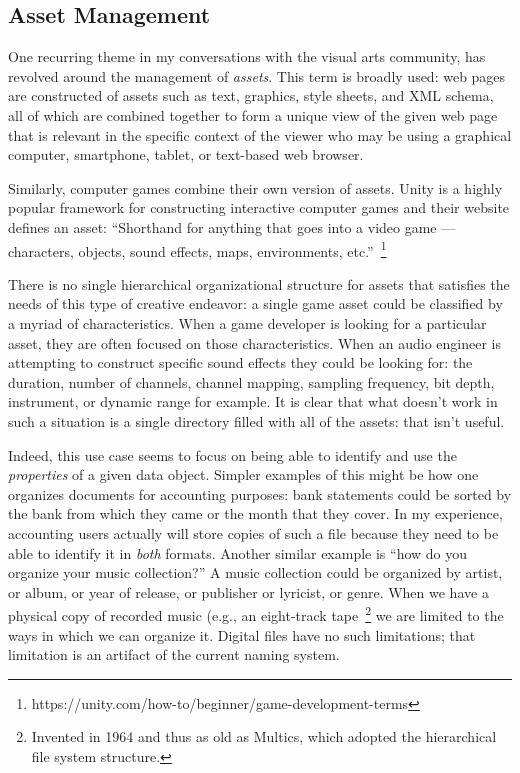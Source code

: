\subsection{Asset Management}
\label{ch:model:sec:use-cases:subsec:asset-management}

One recurring theme in my conversations with the visual arts community, has revolved
around the management of \emph{assets}. This term is broadly used: web pages are
constructed of assets such as text, graphics, style sheets, and XML schema, all
of which are combined together to form a unique view of the given web page that
is relevant in the specific context of the viewer who may be using a graphical
computer, smartphone, tablet, or text-based web browser.

Similarly, computer games combine their own version of assets. Unity is a highly
popular framework for constructing interactive computer games and their website
defines an asset: ``Shorthand for anything that goes into a video game ---
characters, objects, sound effects, maps, environments,
etc.''~\footnote{https://unity.com/how-to/beginner/game-development-terms}

There is no single hierarchical organizational structure for assets that
satisfies the needs of this type of creative endeavor: a single game asset could
be classified by a myriad of characteristics.  When a game developer is looking
for a particular asset, they are often focused on those characteristics.  When
an audio engineer is attempting to construct specific sound effects they could
be looking for: the duration, number of channels, channel mapping, sampling
frequency, bit depth, instrument, or dynamic range for example.  It is clear
that what doesn't work in such a situation is a single directory filled with all
of the assets: that isn't useful.

Indeed, this use case seems to focus on being able to identify and use the
\emph{properties} of a given data object.  Simpler examples of this might be how
one organizes documents for accounting purposes: bank statements could be sorted
by the bank from which they came or the month that they cover.  In my
experience, accounting users actually will store copies of such a file because
they need to be able to identify it in \emph{both} formats.  Another similar
example is ``how do you organize your music collection?''  A music collection
could be organized by artist, or album, or year of release, or publisher or
lyricist, or genre. When we have a physical copy of recorded music (e.g., an
eight-track tape~\footnote{Invented in 1964 and thus as old as Multics, which
    adopted the hierarchical file system structure.} we are limited to the ways in
which we can organize it.  Digital files have no such limitations; that
limitation is an artifact of the current naming system.

